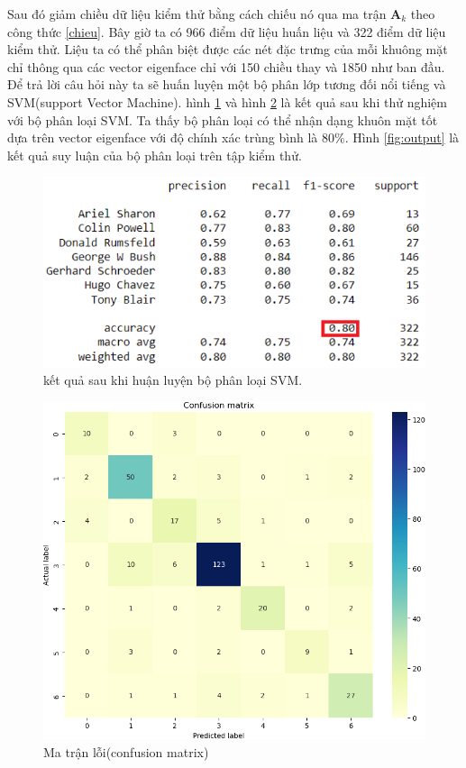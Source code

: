 \documentclass[12pt,a4paper,oneside]{report}
\numberwithin{equation}{section}
\begin{document}
Sau đó giảm chiều dữ liệu kiểm thử bằng cách chiếu nó qua ma trận $\mathbf{A}_k$ theo công thức \ref{chieu}.
Bây giờ ta có 966 điểm dữ liệu huấn liệu và 322 điểm dữ liệu kiểm thử. Liệu ta có thể phân biệt được các nét đặc trưng của mỗi khuông mặt chỉ thông qua các vector eigenface chỉ với 150 chiều thay và 1850 như ban đầu.
Để trả lời câu hỏi này ta sẽ huấn luyện một bộ phân lớp tương đối nổi tiếng và SVM(support Vector Machine).
hình \ref{fig:svm_result} và hình \ref{fig:headmap}  là kết quả sau khi thử nghiệm với bộ phân loại SVM. Ta thấy bộ phân loại có thể nhận dạng khuôn mặt tốt dựa trên vector eigenface với độ chính xác trùng bình là $80\%$. Hình \ref{fig:output} là kết quả suy luận của bộ phân loại trên tập kiểm thử.
\begin{figure}[htp]
	\centering
	\includegraphics[scale=0.8]{result_svm.png}
	\caption{kết quả sau khi huận luyện bộ phân loại SVM.}
	\label{fig:svm_result}
\end{figure}
\begin{figure}[htp]
	\centering
	\includegraphics[scale=0.8]{heatmap.png}
	\caption{Ma trận lỗi(confusion matrix)}
	\label{fig:headmap}
\end{figure}
\end{document}
